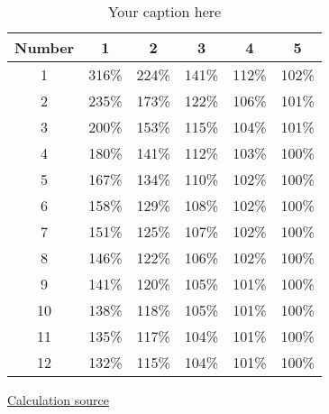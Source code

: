 \begin{table}[h]
    \centering
    \begin{tabular}{c|ccccc}
        \textbf{Number} & \textbf{1} & \textbf{2} & \textbf{3} & \textbf{4} & \textbf{5} \\ \hline
        1 & 316\% & 224\% & 141\% & 112\% & 102\% \\
        2 & 235\% & 173\% & 122\% & 106\% & 101\% \\
        3 & 200\% & 153\% & 115\% & 104\% & 101\% \\
        4 & 180\% & 141\% & 112\% & 103\% & 100\% \\
        5 & 167\% & 134\% & 110\% & 102\% & 100\% \\
        6 & 158\% & 129\% & 108\% & 102\% & 100\% \\
        7 & 151\% & 125\% & 107\% & 102\% & 100\% \\
        8 & 146\% & 122\% & 106\% & 102\% & 100\% \\
        9 & 141\% & 120\% & 105\% & 101\% & 100\% \\
        10 & 138\% & 118\% & 105\% & 101\% & 100\% \\
        11 & 135\% & 117\% & 104\% & 101\% & 100\% \\
        12 & 132\% & 115\% & 104\% & 101\% & 100\% \\
    \end{tabular}
    \caption{Your caption here}
    \label{table:yourlabelhere}
\end{table}

\href{https://docs.google.com/spreadsheets/d/e/2PACX-1vTSial-WTQY0PDA2uLyeZGWxRKeqSEUTQ8Ir32RFY4fW93_aPfC6aD6Loooz6PsjEhB5QSiTCRI1nUo/pubhtml}{Calculation source}
